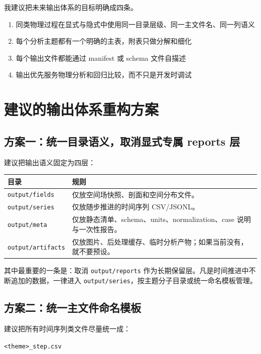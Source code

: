 \documentclass[11pt,a4paper]{ctexart}
\newcommand{\code}[1]{\texttt{#1}}
\newcommand{\dir}[1]{\texttt{#1}}
\begin{document}
我建议把未来输出体系的目标明确成四条。

\begin{enumerate}
  \item 同类物理过程在显式与隐式中使用同一目录层级、同一主文件名、同一列语义
  \item 每个分析主题都有一个明确的主表，附表只做分解和细化
  \item 每个输出文件都能通过 manifest 或 schema 文件自描述
  \item 输出优先服务物理分析和回归比较，而不只是开发时调试
\end{enumerate}

\section{建议的输出体系重构方案}

\subsection{方案一：统一目录语义，取消显式专属 reports 层}

建议把输出语义固定为四层：

\begin{longtable}{p{}p{}}
\toprule
目录 & 规则 \\
\midrule
\endhead
\dir{output/fields} & 仅放空间场快照、剖面和空间分布文件。 \\
\dir{output/series} & 仅放随步推进的时间序列 CSV/JSONL。 \\
\dir{output/meta} & 仅放静态清单、schema、units、normalization、case 说明与一次性报告。 \\
\dir{output/artifacts} & 仅放图片、后处理缓存、临时分析产物；如果当前没有，就不要预设。 \\
\bottomrule
\end{longtable}

其中最重要的一条是：取消 \dir{output/reports} 作为长期保留层。凡是时间推进中不断追加的数据，一律进入 \dir{output/series}，按主题分子目录或统一命名模板管理。

\subsection{方案二：统一主文件命名模板}

建议把所有时间序列类文件尽量统一成：

\begin{center}
\code{<theme>\_step.csv}
\end{center}
\end{document}
